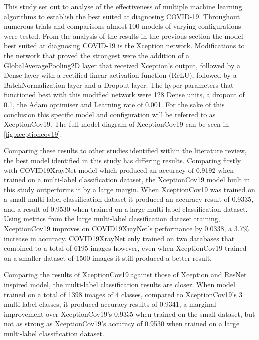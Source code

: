 This study set out to analyse of the effectiveness of multiple machine learning algorithms to establish the best suited at diagnosing COVID-19. Throughout numerous trials and comparisons almost 100 models of varying configurations were tested. From the analysis of the results in the previous section the model best suited at diagnosing COVID-19 is the Xception network. Modifications to the network that proved the strongest were the addition of a GlobalAveragePooling2D layer that received Xception’s output, followed by a Dense layer with a rectified linear activation function (ReLU), followed by a BatchNormalization layer and a Dropout layer. The hyper-parameters that functioned best with this modified network were 128 Dense units, a dropout of 0.1, the Adam optimiser and Learning rate of 0.001. For the sake of this conclusion this specific model and configuration will be referred to as XceptionCov19. The full model diagram of XceptionCov19 can be seen in \autoref{fig:xceptioncov19}.

Comparing these results to other studies identified within the literature review, the best model identified in this study has differing results. Comparing firstly with \cite{zhang2020covid19xraynet} COVID19XrayNet model which produced an accuracy of 0.9192 when trained on a multi-label classification dataset, the XceptionCov19 model built in this study outperforms it by a large margin. When XceptionCov19 was trained on a small multi-label classification dataset it produced an accuracy result of 0.9335, and a result of 0.9530 when trained on a large multi-label classification dataset. Using metrics from the large multi-label classification dataset training, XceptionCov19 improves on COVID19XrayNet's performance by 0.0338, a 3.7\% increase in accuracy. COVID19XrayNet only trained on two databases that combined to a total of 6195 images however, even when XceptionCov19 trained on a smaller dataset of 1500 images it still produced a better result.

Comparing the results of XceptionCov19 against those of \cite{fitriasari2021improvement} Xception and ResNet inspired model, the multi-label classification results are closer. When \cite{fitriasari2021improvement} model trained on a total of 1398 images of 4 classes, compared to XceptionCov19's 3 multi-label classes, it produced accuracy results of 0.9341, a marginal improvement over XceptionCov19's 0.9335 when trained on the small dataset, but not as strong as XceptionCov19's accuracy of 0.9530 when trained on a large multi-label classification dataset.

